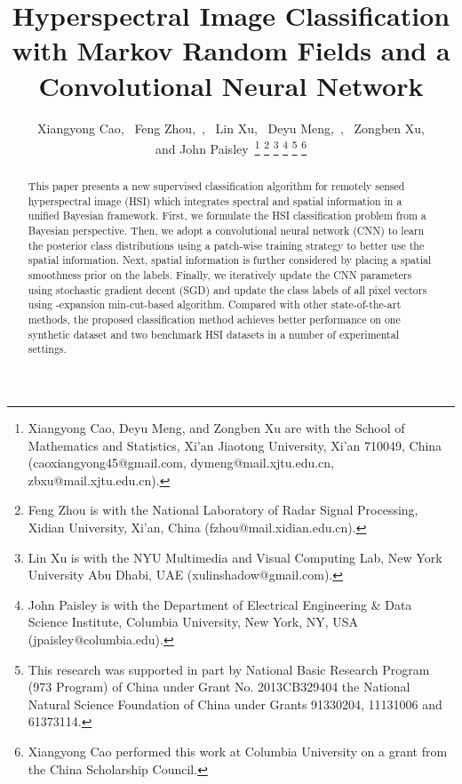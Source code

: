 \documentclass[journal]{IEEEtran}
\begin{document}
	
	\title{Hyperspectral Image {{Classification}} with Markov Random Fields and a Convolutional Neural Network}
	
	\author{Xiangyong Cao,~
		Feng Zhou,~, ~Lin Xu, ~Deyu Meng,~, ~Zongben Xu, \\and John Paisley~\thanks{Xiangyong Cao, Deyu Meng, and Zongben Xu are with the School of Mathematics and Statistics, Xi'an Jiaotong University, Xi'an 710049, China (caoxiangyong45@gmail.com, dymeng@mail.xjtu.edu.cn, zbxu@mail.xjtu.edu.cn).} 	
		\thanks{Feng Zhou is with the National Laboratory of Radar Signal Processing, Xidian University, Xi'an, China (fzhou@mail.xidian.edu.cn).} \thanks{Lin Xu is with the NYU Multimedia and Visual Computing Lab, New York University Abu Dhabi, UAE (xulinshadow@gmail.com).}
		\thanks{John Paisley is with the Department of Electrical Engineering \& Data Science Institute, Columbia University, New York, NY, USA (jpaisley@columbia.edu).}
		\thanks{This research was supported in part by National Basic Research Program (973 Program) of China under Grant No. 2013CB329404 the National Natural Science Foundation of China under Grants 91330204, 11131006 and 61373114.}
		\thanks{Xiangyong Cao performed this work at Columbia University on a grant from the China Scholarship Council.}
	}
	
	
	\maketitle
	
	\begin{abstract}
		This paper presents a new supervised {{classification}} algorithm for remotely sensed hyperspectral image (HSI) which integrates spectral and spatial information in a unified Bayesian framework. First, we formulate the HSI {{classification}} problem from a Bayesian perspective. Then, we adopt a convolutional neural network (CNN) to learn the posterior class distributions using a patch-wise training strategy to better use the spatial information. Next, spatial information is further considered by placing a spatial smoothness prior on the labels. {{Finally, we iteratively update the CNN parameters using stochastic gradient decent (SGD)} and update the class labels of all pixel vectors using -expansion min-cut-based algorithm.} Compared with other state-of-the-art methods, the proposed {{classification}} method achieves better performance on one synthetic dataset and two benchmark HSI datasets in a number of experimental settings.
	\end{abstract}
	
\end{document}
